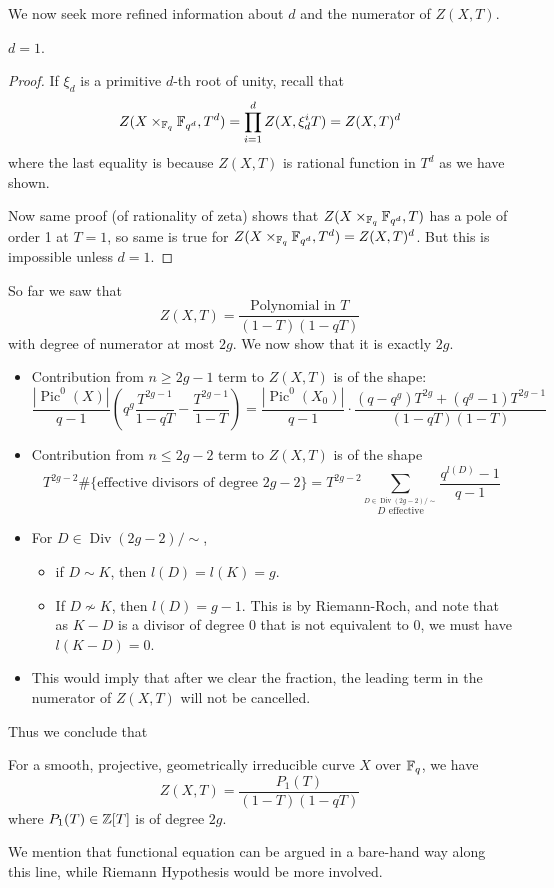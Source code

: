 \documentclass[letterpaper,11pt]{article}
\DeclareMathOperator{\Div}{Div}
\DeclareMathOperator{\Pic}{Pic}
\begin{document}
We now seek more refined information about $d$ and the numerator of $Z(X,T)$.
\begin{claim}
$d = 1$.
\end{claim}
\begin{proof}
If $\xi_d$ is a primitive $d$-th root of unity, recall that
\[
Z(X \times_{\mathbb{F}_q} \mathbb{F}_{q^d}, T^d) = \prod_{i=1}^d Z(X, \xi_d^i T) = Z(X,T)^d
\]
where the last equality is because $Z(X,T)$ is rational function in $T^d$ as we have shown.

Now same proof (of rationality of zeta) shows that $Z(X \times_{\mathbb{F}_q} \mathbb{F}_{q^d},T)$ has a pole of order 1 at $T = 1$, so same is true for $Z(X \times_{\mathbb{F}_q} \mathbb{F}_{q^d},T^d) = Z(X,T)^d$. But this is impossible unless $d = 1$.
\end{proof}
So far we saw that 
\[
Z(X,T) = \frac{\text{Polynomial in $T$}}{(1-T)(1-qT)}
\]
with degree of numerator at most $2g$. We now show that it is exactly $2g$.
\begin{itemize}
    \item Contribution from $n \ge 2g-1$ term to $Z(X,T)$ is of the shape:
    \[
    \frac{|\Pic^0(X)|}{q-1} \left(q^{g} \frac{T^{2g-1}}{1-qT} - \frac{T^{2g-1}}{1-T}\right) = \frac{|\Pic^0(X_0)|}{q-1} \cdot \frac{(q-q^g)T^{2g} + (q^g - 1)T^{2g-1}}{(1-qT)(1-T)}
    \]
    \item Contribution from $n \leq 2g-2$ term to $Z(X,T)$ is of the shape
    \[
    T^{2g-2} \#\{\text{effective divisors of degree $2g-2$}\} = T^{2g-2} \sum_{{\stackrel{D \in \Div(2g-2)/\sim}{D \text{ effective}}}} \frac{q^{l(D)} - 1}{q-1}
    \]
    \item For $D \in \Div(2g-2)/\sim$,
    \begin{itemize}
        \item if $D \sim K$, then $l(D) = l(K) = g$.
        \item If $D \not\sim K$, then $l(D) = g-1$. This is by Riemann-Roch, and note that as $K-D$ is a divisor of degree 0 that is not equivalent to 0, we must have $l(K-D) = 0$.
    \end{itemize}
    \item This would imply that after we clear the fraction, the leading term in the numerator of $Z(X,T)$ will not be cancelled.
\end{itemize}
Thus we conclude that
\begin{thm} For a smooth, projective, geometrically irreducible curve $X$ over $\mathbb{F}_q$, we have
\[
Z(X,T) = \frac{P_1(T)}{(1-T)(1-qT)}
\]
where $P_1(T) \in \mathbb{Z}[T]$ is of degree $2g$.
\end{thm}
We mention that functional equation can be argued in a bare-hand way along this line, while Riemann Hypothesis would be more involved.
\end{document}
